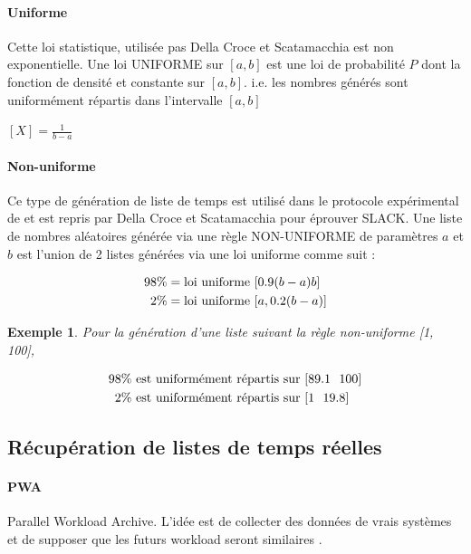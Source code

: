 \documentclass[a4paper,12pt]{report}
\theoremstyle{plain}				%
\newtheorem{example}{Exemple}
\theoremstyle{definition}				%
\newcommand\dcs{Della Croce et Scatamacchia\xspace}
\begin{document}
\paragraph{Uniforme} Cette loi statistique, utilisée pas \dcs est non exponentielle. 
Une loi UNIFORME sur $[a, b]$ est une loi de probabilité $P$ dont la fonction de densité et 
  constante sur $[a, b]$. i.e. les nombres générés sont uniformément répartis dans l'intervalle $[a, b]$

\begin{center}
$[X] = \frac{1}{b-a}$
\end{center}

\paragraph{Non-uniforme} Ce type de génération de liste de temps est utilisé dans le protocole expérimental de \cite{frangioni2004multi} et est repris par \dcs \cite{della2020longest} pour éprouver SLACK.
Une liste de nombres aléatoires générée via une règle NON-UNIFORME de paramètres $a$ et $b$ 
  est l'union de 2 listes générées via une loi uniforme comme suit :

\begin{align*}
	98 \%  &= \textnormal{loi uniforme } [0.9(b-a) b] \\
	2\%    &= \textnormal{loi uniforme } [a, 0.2(b-a)] 
\end{align*}

\begin{example}
Pour la génération d'une liste suivant la règle non-uniforme [1, 100], 

\begin{align*}
	98 \%  &\textnormal{ est uniformément répartis sur } [89.1~~ 100] \\
	2\%    &\textnormal{ est uniformément répartis sur } [1   ~~ 19.8] 
\end{align*}

\end{example}

 
\subsection{Récupération de listes de temps réelles}\label{ssec:instancesGenerationListesTempsReelles}

\paragraph{PWA} Parallel Workload Archive. L'idée est de collecter des données de vrais systèmes et de 
  supposer que les futurs workload seront similaires \cite{feitelson2014experience}.
\end{document}
